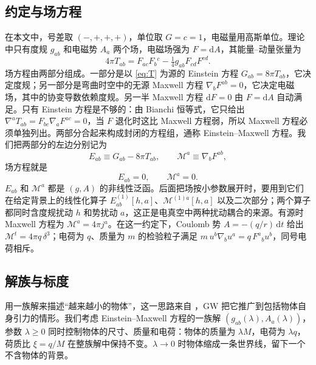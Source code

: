 \documentclass[11pt,a4paper]{ctexart}
\newcommand{\dd}{\mathrm d}
\newcommand{\M}{\mathcal M}
\begin{document}
\subsection{约定与场方程}\label{sec:conv}

在本文中，号差取 $(-,+,+,+)$，单位取 $G=c=1$，电磁量用高斯单位。理论中只有度规 $g_{ab}$ 和电磁势 $A_a$ 两个场，电磁场强为 $F=\dd A$，其能量--动量张量为
\begin{equation}
4\pi T_{ab}=F_{ac}F_b{}^c-\tfrac14g_{ab}F_{cd}F^{cd}.
\label{eq:T}
\end{equation}
场方程由两部分组成。一部分是以 \eqref{eq:T} 为源的 Einstein 方程 $G_{ab}=8\pi T_{ab}$，它决定度规；另一部分是弯曲时空中的无源 Maxwell 方程 $\nabla_bF^{ab}=0$，它决定电磁场，其中的协变导数依赖度规。另一半 Maxwell 方程 $\dd F=0$ 由 $F=\dd A$ 自动满足。只有 Einstein 方程是不够的：由 Bianchi 恒等式，它只给出 $\nabla^aT_{ab}=F_{bc}\nabla_aF^{ac}=0$，当 $F$ 退化时这比 Maxwell 方程弱，所以 Maxwell 方程必须单独列出。两部分合起来构成封闭的方程组，通称 Einstein--Maxwell 方程。我们把两部分的左边分别记为
\begin{equation}
E_{ab}\equiv G_{ab}-8\pi T_{ab},\qquad \M^a\equiv\nabla_bF^{ab},
\label{eq:EMdef}
\end{equation}
场方程就是
\begin{equation}
E_{ab}=0,\qquad \M^a=0.
\label{eq:EM}
\end{equation}
$E_{ab}$ 和 $\M^a$ 都是 $(g,A)$ 的非线性泛函。后面把场按小参数展开时，要用到它们在给定背景上的线性化算子 $E^{(1)}_{ab}[h,a]$、$\M^{(1)a}[h,a]$ 以及二次部分；两个算子都同时含度规扰动 $h$ 和势扰动 $a$，这正是电真空中两种扰动耦合的来源。有源时 Maxwell 方程为 $\M^a=4\pi j^a$。在这一约定下，Coulomb 势 $A=-(q/r)\,\dd t$ 给出 $\M^t=4\pi q\,\delta^3$；电荷为 $q$、质量为 $m$ 的检验粒子满足 $m\,u^b\nabla_bu^a=q\,F^a{}_bu^b$，同号电荷相斥。

\subsection{解族与标度}\label{sec:family}

用一族解来描述“越来越小的物体”，这一思路来自 \citet{GerochJang1975}，GW 把它推广到包括物体自身引力的情形。我们考虑 Einstein--Maxwell 方程的一族解 $(g_{ab}(\lambda),A_a(\lambda))$，参数 $\lambda\ge0$ 同时控制物体的尺寸、质量和电荷：物体的质量为 $\lambda M$，电荷为 $\lambda q$，荷质比 $\xi=q/M$ 在整族解中保持不变。$\lambda\to0$ 时物体缩成一条世界线，留下一个不含物体的背景。
\end{document}
